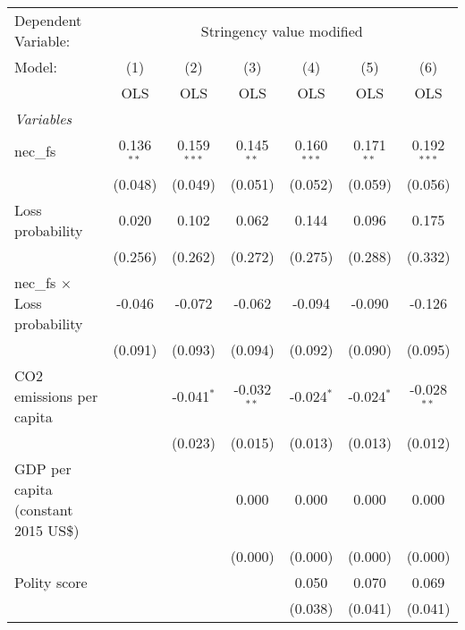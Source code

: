 
\begingroup
\centering
\begin{tabular}{lcccccc}
   \toprule
   Dependent Variable: & \multicolumn{6}{c}{Stringency value modified}\\
   Model:                               & (1)          & (2)           & (3)           & (4)           & (5)          & (6)\\  
                                        &  OLS         & OLS           & OLS           & OLS           & OLS          & OLS\\  
   \midrule
   \emph{Variables}\\
   nec\_fs                              & 0.136$^{**}$ & 0.159$^{***}$ & 0.145$^{**}$  & 0.160$^{***}$ & 0.171$^{**}$ & 0.192$^{***}$\\   
                                        & (0.048)      & (0.049)       & (0.051)       & (0.052)       & (0.059)      & (0.056)\\   
   Loss probability                     & 0.020        & 0.102         & 0.062         & 0.144         & 0.096        & 0.175\\   
                                        & (0.256)      & (0.262)       & (0.272)       & (0.275)       & (0.288)      & (0.332)\\   
   nec\_fs $\times$ Loss probability    & -0.046       & -0.072        & -0.062        & -0.094        & -0.090       & -0.126\\   
                                        & (0.091)      & (0.093)       & (0.094)       & (0.092)       & (0.090)      & (0.095)\\   
   CO2 emissions per capita             &              & -0.041$^{*}$  & -0.032$^{**}$ & -0.024$^{*}$  & -0.024$^{*}$ & -0.028$^{**}$\\   
                                        &              & (0.023)       & (0.015)       & (0.013)       & (0.013)      & (0.012)\\   
   GDP per capita (constant 2015 US\$)  &              &               & 0.000         & 0.000         & 0.000        & 0.000\\   
                                        &              &               & (0.000)       & (0.000)       & (0.000)      & (0.000)\\   
   Polity score                         &              &               &               & 0.050         & 0.070        & 0.069\\   
                                        &              &               &               & (0.038)       & (0.041)      & (0.041)\\   

\end{tabular}
